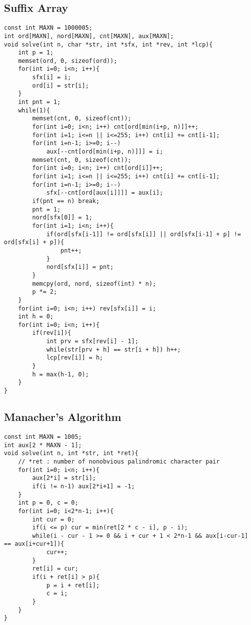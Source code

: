 \documentclass[landscape, 8pt, a4paper, oneside, twocolumn]{extarticle}
\begin{document}
\subsection{Suffix Array}
\begin{verbatim}
const int MAXN = 1000005;
int ord[MAXN], nord[MAXN], cnt[MAXN], aux[MAXN];
void solve(int n, char *str, int *sfx, int *rev, int *lcp){
	int p = 1;
	memset(ord, 0, sizeof(ord));
	for(int i=0; i<n; i++){
		sfx[i] = i;
		ord[i] = str[i];
	}
	int pnt = 1;
	while(1){
		memset(cnt, 0, sizeof(cnt));
		for(int i=0; i<n; i++) cnt[ord[min(i+p, n)]]++;
		for(int i=1; i<=n || i<=255; i++) cnt[i] += cnt[i-1];
		for(int i=n-1; i>=0; i--)
			aux[--cnt[ord[min(i+p, n)]]] = i;
		memset(cnt, 0, sizeof(cnt));
		for(int i=0; i<n; i++) cnt[ord[i]]++;
		for(int i=1; i<=n || i<=255; i++) cnt[i] += cnt[i-1];
		for(int i=n-1; i>=0; i--)
			sfx[--cnt[ord[aux[i]]]] = aux[i];
		if(pnt == n) break;
		pnt = 1;
		nord[sfx[0]] = 1;
		for(int i=1; i<n; i++){
			if(ord[sfx[i-1]] != ord[sfx[i]] || ord[sfx[i-1] + p] != ord[sfx[i] + p]){
				pnt++;
			}
			nord[sfx[i]] = pnt;
		}
		memcpy(ord, nord, sizeof(int) * n);
		p *= 2;
	}
	for(int i=0; i<n; i++) rev[sfx[i]] = i;
	int h = 0;
	for(int i=0; i<n; i++){
		if(rev[i]){
			int prv = sfx[rev[i] - 1];
			while(str[prv + h] == str[i + h]) h++;
			lcp[rev[i]] = h;
		}
		h = max(h-1, 0);
	}
}
\end{verbatim}
\subsection{Manacher's Algorithm}
\begin{verbatim}
const int MAXN = 1005;
int aux[2 * MAXN - 1];
void solve(int n, int *str, int *ret){
	// *ret : number of nonobvious palindromic character pair
	for(int i=0; i<n; i++){
		aux[2*i] = str[i];
		if(i != n-1) aux[2*i+1] = -1;
	}
	int p = 0, c = 0;
	for(int i=0; i<2*n-1; i++){
		int cur = 0;
		if(i <= p) cur = min(ret[2 * c - i], p - i);
		while(i - cur - 1 >= 0 && i + cur + 1 < 2*n-1 && aux[i-cur-1] == aux[i+cur+1]){
			cur++;
		}
		ret[i] = cur;
		if(i + ret[i] > p){
			p = i + ret[i];
			c = i;
		}
	}
}
\end{verbatim}
\end{document}
